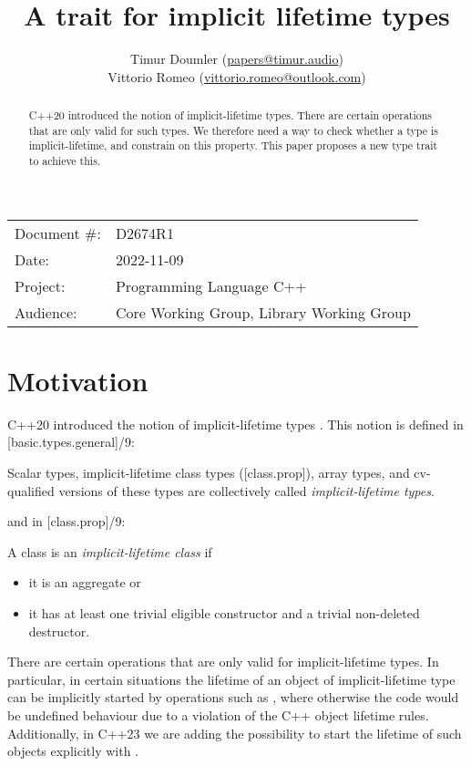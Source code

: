 


\title{A trait for implicit lifetime types}
\author{ Timur Doumler \small(\href{mailto:papers@timur.audio}{papers@timur.audio})  \\ Vittorio Romeo \small(\href{mailto:vittorio.romeo@outlook.com}{vittorio.romeo@outlook.com}) }
\date{}
\maketitle

\begin{tabular}{ll}
Document \#: & D2674R1 \\
Date: &2022-11-09 \\
Project: & Programming Language C++ \\
Audience: & Core Working Group, Library Working Group
\end{tabular}

\begin{abstract}
C++20 introduced the notion of implicit-lifetime types. There are certain operations that are only valid for such types. We therefore need a way to check whether a type is implicit-lifetime, and constrain on this property. This paper proposes a new type trait  to achieve this.
\end{abstract}

\section{Motivation}
\label{sec:motivation}

C++20 introduced the notion of implicit-lifetime types \cite{P0593R6}. This notion is defined in [basic.types.general]/9:

\begin{adjustwidth}{0.5cm}{0.5cm}
Scalar types, implicit-lifetime class types ([class.prop]), array types, and cv-qualified versions of these types are collectively called \emph{implicit-lifetime types}.
\end{adjustwidth}

and in [class.prop]/9:

\begin{adjustwidth}{0.5cm}{0.5cm}
A class  is an \emph{implicit-lifetime class} if 
\begin{itemize}
\item it is an aggregate or
\item it has at least one trivial eligible constructor and a trivial non-deleted destructor.
\end{itemize}
\end{adjustwidth}
There are certain operations that are only valid for implicit-lifetime types. In particular, in certain situations the lifetime of an object of implicit-lifetime type can be implicitly started by operations such as , where otherwise the code would be undefined behaviour due to a violation of the C++ object lifetime rules. Additionally, in C++23 we are adding the possibility to start the lifetime of such objects explicitly with  \cite{P2590R2}.

